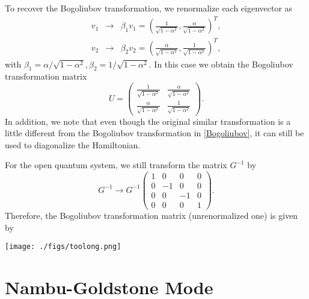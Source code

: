 \documentclass[aps,onecolumn,superscriptaddress,notitlepage,longbibliography]{revtex4-1}
\begin{document}
To recover the Bogoliubov transformation, we renormalize each eigenvector as
\begin{eqnarray}
  v_1 & \rightarrow & \beta_1 v_1 = \left( \frac{1}{\sqrt{1 - \alpha^2}},
  \frac{\alpha}{\sqrt{1 - \alpha^2}} \right)^T, \\
  v_2 & \rightarrow & \beta_2 v_2 = \left( \frac{\alpha}{\sqrt{1 - \alpha^2}},
  \frac{1}{\sqrt{1 - \alpha^2}} \right)^T, 
\end{eqnarray}
with $\beta_1 = \alpha / \sqrt{1 - \alpha^2}, \beta_2 = 1 / \sqrt{1 -
\alpha^2}$. In this case we obtain the Bogoliubov transformation matrix
\begin{equation}
  U = \left(\begin{array}{cc}
    \frac{1}{\sqrt{1 - \alpha^2}} & \frac{\alpha}{\sqrt{1 - \alpha^2}}\\
    \frac{\alpha}{\sqrt{1 - \alpha^2}} & \frac{1}{\sqrt{1 - \alpha^2}}
  \end{array}\right) . \label{Bogoliubov}
\end{equation}
In addition, we note that even though the original similar transformation is a
little different from the Bogoliubov transformation in \eqref{Bogoliubov}, it
can still be used to diagonalize the Hamiltonian.

For the open quantum system, we still transform the matrix $G^{- 1}$ by
\begin{equation}
  G^{- 1} \rightarrow G^{- 1} \left(\begin{array}{cccc}
    1 & 0 & 0 & 0\\
    0 & - 1 & 0 & 0\\
    0 & 0 & - 1 & 0\\
    0 & 0 & 0 & 1
  \end{array}\right) .
\end{equation}
Therefore, the Bogoliubov transformation matrix (unrenormalized one) is given
by


\texttt{[image: ./figs/toolong.png]}

\section{Nambu-Goldstone Mode}
\end{document}
